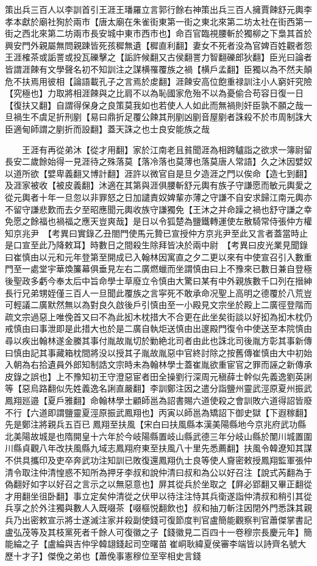 策出兵三百人以李訓首引王涯王璠羅立言郭行餘右神策出兵三百人擁賈餗舒元輿李孝本獻於廟社狥於兩市【唐太廟在朱雀街東第一街之東北來第二坊太社在街西第一街之西北來第二坊兩市長安城中東市西市也】命百官臨視腰斬於獨柳之下梟其首於興安門外親屬無問親踈皆死孩穉無遺【穉直利翻】妻女不死者没為官婢百姓觀者怨王涯榷茶或詬詈或投瓦礫擊之【詬許候翻又古侯翻詈力智翻礫郎狄翻】臣光曰論者皆謂涯餗有文學聲名初不知訓注之謀横罹覆族之禍【横戶孟翻】臣獨以為不然夫顛危不扶焉用彼相【論語載孔子之言焉於䖍翻】涯餗安高位飽重禄訓注小人窮奸究險【究極也】力取將相涯餗與之比肩不以為恥國家危殆不以為憂偷合苟容日復一日【復扶又翻】自謂得保身之良策莫我如也若使人人如此而無禍則奸臣孰不願之哉一旦禍生不虞足折刑剭【易曰鼎折足覆公餗其刑剭凶剭音屋剭者誅殺不於市周制誅大臣適甸師謂之剭折而設翻】蓋天誅之也士良安能族之哉

　　王涯有再從弟沐【從才用翻】家於江南老且貧聞涯為相跨驢詣之欲求一簿尉留長安二歲餘始得一見涯待之殊落莫【落冷落也莫薄也落莫唐人常語】久之沐因嬖奴以道所欲【嬖卑義翻又博計翻】涯許以微官自是旦夕造涯之門以俟命【造七到翻】及涯家被收【被皮義翻】沐適在其第與涯俱腰斬舒元輿有族子守謙愿而敏元輿愛之從元輿者十年一旦忽以非罪怒之日加譴責奴婢輩亦薄之守謙不自安求歸江南元輿亦不留守謙悲歎而去夕至昭應聞元輿收族守謙獨免【王沐之并命躁之禍也舒守謙之幸免愿之餘福也禍福之應天豈爽哉】是日以令狐楚為鹽鐵轉運使左散騎常侍張仲方權知京兆尹　【考異曰實錄乙丑閤門使馬元贄已宣授仲方京兆尹至此又言者蓋當時止是口宣至此乃降敕耳】時數日之間殺生除拜皆决於兩中尉　【考異曰皮光業見聞錄曰崔慎由以元和元年登第至開成已入翰林因寓直之夕二更以來有中使宣召引入數重門至一處堂宇華煥簾幕俱垂見左右二廣燃蠟而坐謂慎由曰上不豫來已數日兼自登極後聖政多虧今奉太后中旨命學士草廢立令慎由大驚曰某有中外親族數千口列在搢紳長行兄弟甥姪僅三百人一旦聞此覆族之言寜死不敢承命况聖上高明之德覆於八荒豈可輕議二廣默然無以為對良久啟後戶引慎由至一小殿見文宗坐於殿上二廣徑登階而疏文宗過惡上唯俛首又曰不為此抝木枕措大不合更在此坐矣街談以好抝為抝木枕仍戒慎由曰事泄即是此措大也於是二廣自執炬送慎由出邃殿門復令中使送至本院慎由尋以疾出翰林遂金縢其事付胤故胤切於勦絶北司者由此也誅北司後胤方彰其事新傳曰慎由記其事藏箱枕間將没以授其子胤故胤惡中官終討除之按舊傳崔慎由大中初始入朝為右拾遺員外郎知制誥文宗時未為翰林學士蓋崔胤欲重宦官之罪而誣之新傳承皮錄之誤也】上不豫知初王守澄惡宦者田全操劉行深周元稹薛士幹似先義逸劉英誗等【惡烏路翻似先姓義逸名誗直嚴翻】李訓鄭注因之遣分詣鹽州靈武涇原夏州振武鳳翔廵邉【夏戶雅翻】命翰林學士顧師邕為詔書賜六道使殺之會訓敗六道得詔皆廢不行【六道即謂鹽靈夏涇原振武鳳翔也】丙寅以師邕為矯詔下御史獄【下遐稼翻】先是鄭注將親兵五百已鳳翔至扶風【宋白曰扶風縣本漢美陽縣地今京兆府武功縣北美陽故城是也隋開皇十六年於今岐陽縣置岐山縣武德三年分岐山縣於闈川城置圍川縣貞觀八年改扶風縣九域志鳳翔府東至扶風八十里先悉薦翻】扶風令韓遼知其謀不供具攜印及吏卒奔武功注知訓已敗復還鳳翔仇士良等使人齎密敕授鳳翔監軍張仲清令取注仲清惶惑不知所為押牙李叔和說仲清曰叔和為公以好召注【說式芮翻為于偽翻好如字以好召之言示之以無惡意也】屏其從兵於坐取之【屛必郢翻又畢正翻從才用翻坐徂卧翻】事立定矣仲清從之伏甲以待注注恃其兵衛遂詣仲清叔和稍引其從兵享之於外注獨與數人入既啜茶【啜樞悦翻飲也】叔和抽刀斬注因閉外門悉誅其親兵乃出密敕宣示將士遂滅注家并殺副使錢可復節度判官盧簡能觀察判官蕭傑掌書記盧弘茂等及其枝黨死者千餘人可復徽之子【錢徽見二百四十一卷穆宗長慶元年】簡能綸之子【盧綸與吉仲孚韓翃錢起司空曙苗崔峒耿緯夏侯審李端皆以詩齊名號大歷十才子】傑俛之弟也【蕭俛事憲穆位至宰相史言錢